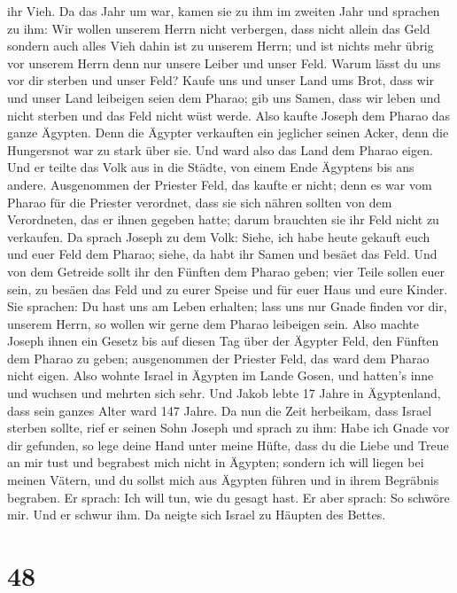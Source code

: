 ihr Vieh.  Da das Jahr um war, kamen sie zu ihm im
zweiten Jahr und sprachen zu ihm: Wir wollen unserem Herrn nicht
verbergen, dass nicht allein das Geld sondern auch alles Vieh dahin ist
zu unserem Herrn; und ist nichts mehr übrig vor unserem Herrn denn nur
unsere Leiber und unser Feld.  Warum lässt du uns vor dir
sterben und unser Feld? Kaufe uns und unser Land ums Brot, dass wir und
unser Land leibeigen seien dem Pharao; gib uns Samen, dass wir leben und
nicht sterben und das Feld nicht wüst werde.  Also kaufte
Joseph dem Pharao das ganze Ägypten. Denn die Ägypter verkauften ein
jeglicher seinen Acker, denn die Hungersnot war zu stark über sie. Und
ward also das Land dem Pharao eigen.  Und er teilte das
Volk aus in die Städte, von einem Ende Ägyptens bis ans andere.
 Ausgenommen der Priester Feld, das kaufte er nicht; denn
es war vom Pharao für die Priester verordnet, dass sie sich nähren
sollten von dem Verordneten, das er ihnen gegeben hatte; darum brauchten
sie ihr Feld nicht zu verkaufen.  Da sprach Joseph zu dem
Volk: Siehe, ich habe heute gekauft euch und euer Feld dem Pharao;
siehe, da habt ihr Samen und besäet das Feld.  Und von
dem Getreide sollt ihr den Fünften dem Pharao geben; vier Teile sollen
euer sein, zu besäen das Feld und zu eurer Speise und für euer Haus und
eure Kinder.  Sie sprachen: Du hast uns am Leben
erhalten; lass uns nur Gnade finden vor dir, unserem Herrn, so wollen
wir gerne dem Pharao leibeigen sein.  Also machte Joseph
ihnen ein Gesetz bis auf diesen Tag über der Ägypter Feld, den Fünften
dem Pharao zu geben; ausgenommen der Priester Feld, das ward dem Pharao
nicht eigen.  Also wohnte Israel in Ägypten im Lande
Gosen, und hatten's inne und wuchsen und mehrten sich sehr.
 Und Jakob lebte 17 Jahre in Ägyptenland, dass sein
ganzes Alter ward 147 Jahre.  Da nun die Zeit herbeikam,
dass Israel sterben sollte, rief er seinen Sohn Joseph und sprach zu
ihm: Habe ich Gnade vor dir gefunden, so lege deine Hand unter meine
Hüfte, dass du die Liebe und Treue an mir tust und begrabest mich nicht
in Ägypten;  sondern ich will liegen bei meinen Vätern,
und du sollst mich aus Ägypten führen und in ihrem Begräbnis begraben.
Er sprach: Ich will tun, wie du gesagt hast.  Er aber
sprach: So schwöre mir. Und er schwur ihm. Da neigte sich Israel zu
Häupten des Bettes.

\hypertarget{section-47}{%
\section{48}\label{section-47}}

